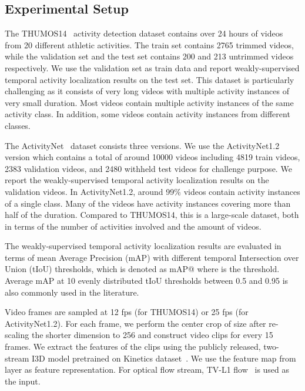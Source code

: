 \documentclass[runningheads]{llncs}
\begin{document}
\subsection{Experimental  Setup}
\label{sec:exp:setup}


The THUMOS14~\cite{THUMOS14} activity detection dataset contains over 24 hours of videos from 20 different athletic activities. The train set contains 2765 trimmed videos, while the validation set and the test set contains 200 and 213 untrimmed videos respectively. 
We use the validation set as train data and report weakly-supervised temporal activity localization results on the test set. This dataset is particularly challenging as it consists of very long videos with multiple activity instances of very small duration. Most videos contain multiple activity instances of the same activity class. In addition, some videos contain activity instances from different classes.

\smallskip
The ActivityNet~\cite{caba2015activitynet} dataset consists three versions. We use the ActivityNet1.2 version which contains a total of around 10000 videos including 4819 train videos, 2383 validation videos, and 2480 withheld test videos for challenge purpose. 
We report the weakly-supervised temporal activity localization results on the validation videos. In ActivityNet1.2, around 99\% videos contain activity instances of a single class. Many of the videos have activity instances covering more than half of the duration. Compared to THUMOS14, this is a large-scale dataset, both in terms of the number of activities involved and the amount of videos.

\smallskip
{}
The weakly-supervised temporal activity localization results are evaluated in terms of mean Average Precision (mAP) with different temporal Intersection over Union (tIoU) thresholds, which is denoted as mAP@ where  is the threshold. Average mAP at 10 evenly distributed tIoU thresholds between 0.5 and 0.95 is also commonly used in the literature.

\smallskip
{} 
Video frames are sampled at 12 fps (for THUMOS14) or 25 fps (for ActivityNet1.2). For each frame, we perform the center crop of size  after re-scaling the shorter dimension to 256 and construct video clips for every 15 frames. We extract the features of the clips using the publicly released, two-stream I3D model pretrained on Kinetics dataset~\cite{Carreira2017QuoVA}. We use the feature map from  layer as feature representation. For optical flow stream, TV-L1 flow~\cite{wang2016temporal,zach2007duality} is used as the input. 
\end{document}
